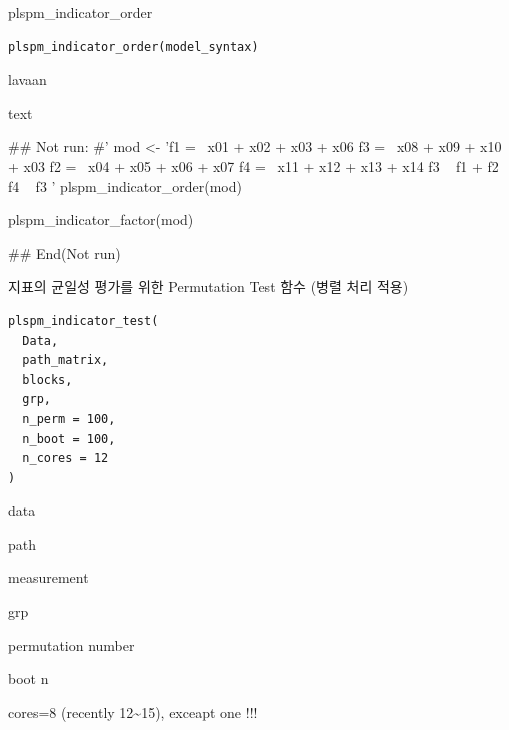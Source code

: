 \documentclass[a4paper]{book}
\begin{document}
%
\begin{Description}
plspm\_indicator\_order
\end{Description}
%
\begin{Usage}
\begin{verbatim}
plspm_indicator_order(model_syntax)
\end{verbatim}
\end{Usage}
%
\begin{Arguments}
\begin{ldescription}
\item[\code{model\_syntax}] lavaan
\end{ldescription}
\end{Arguments}
%
\begin{Value}
text
\end{Value}
%
\begin{Examples}
\begin{ExampleCode}
## Not run: 
#'
mod <-
  'f1 =~ x01 + x02 + x03 + x06
    f3 =~ x08 + x09 + x10 + x03
    f2 =~ x04 + x05 + x06 + x07
    f4 =~ x11 + x12 + x13 + x14
    f3 ~ f1 + f2
    f4 ~ f3
   '
plspm_indicator_order(mod)

plspm_indicator_factor(mod)

## End(Not run)

\end{ExampleCode}
\end{Examples}
%
\begin{Description}
지표의 균일성 평가를 위한 Permutation Test 함수 (병렬 처리 적용)
\end{Description}
%
\begin{Usage}
\begin{verbatim}
plspm_indicator_test(
  Data,
  path_matrix,
  blocks,
  grp,
  n_perm = 100,
  n_boot = 100,
  n_cores = 12
)
\end{verbatim}
\end{Usage}
%
\begin{Arguments}
\begin{ldescription}
\item[\code{Data}] data

\item[\code{path\_matrix}] path

\item[\code{blocks}] measurement

\item[\code{grp}] grp

\item[\code{n\_perm}] permutation number

\item[\code{n\_boot}] boot n

\item[\code{n\_cores}] cores=8 (recently 12\textasciitilde{}15), exceapt one !!!
\end{ldescription}
\end{Arguments}
\end{document}
